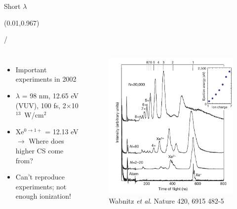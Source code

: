\documentclass{beamer}
\makeatletter
\newcommand{\framenumber}{
\begin{textblock}{0}(0.01,0.967)
\begin{scriptsize}
{\color{gray}\insertframenumber/\inserttotalframenumber}
\end{scriptsize}
\end{textblock}
}
\makeatother
\begin{document}
\begin{frame}{}
\begin{columns}
	\end{columns}
\end{frame}

\begin{frame}{Short $\lambda$}\framenumber
	\begin{columns}
			\begin{itemize}
			\item Important experiments in 2002
			\item $\lambda$ = 98 nm, 12.65 eV (VUV), 100 fs, 2$\times$10$^{13}$~W/cm$^2$
			\item Xe$^{0\rightarrow1+}$ = 12.13 eV $\rightarrow$ Where does higher CS come from?
			\item Can't reproduce experiments; not enough ionization!
			\end{itemize}
			\begin{figure}
			\includegraphics[width=\textwidth]{figures/Wabnitz2002_fig1}
			\caption{{\tiny Wabnitz \textit{et al}. Nature 420, 6915 482-5}}
			\end{figure}
	\end{columns}
\end{frame}
\end{document}
